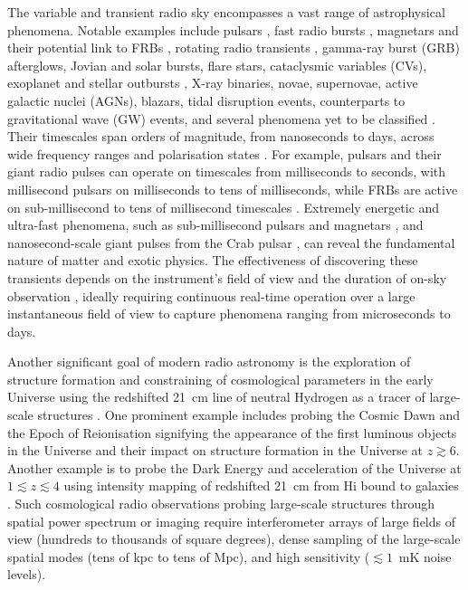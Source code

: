 \documentclass[
  journal=pasa,
  manuscript=article-type,
  year=2020,
  volume=37,
]{cup-journal}
\begin{document}
The variable and transient radio sky encompasses a vast range of astrophysical phenomena. Notable examples include pulsars \citep{Keane2013}, fast radio bursts \citep[FRB;][]{Lorimer+2007,Thornton+2013}, magnetars and their potential link to FRBs \citep{Bochenek+2020}, rotating radio transients \citep[RRAT][]{Mclaughlin+2006}, gamma-ray burst (GRB) afterglows, Jovian and solar bursts, flare stars, cataclysmic variables (CVs), exoplanet and stellar outbursts \citep{Zhang+2023}, X-ray binaries, novae, supernovae, active galactic nuclei (AGNs), blazars, tidal disruption events, counterparts to gravitational wave (GW) events, and several phenomena yet to be classified \citep{Thyagarajan+2011}. Their timescales span orders of magnitude, from nanoseconds to days, across wide frequency ranges and polarisation states \citep[][and references therein]{Pietka+2015,Chandra+2016,Nimmo+2022}. For example, pulsars and their giant radio pulses can operate on timescales from milliseconds to seconds, with millisecond pulsars on milliseconds to tens of milliseconds, while FRBs are active on sub-millisecond to tens of millisecond timescales \citep{Crawford+2022,Gupta+2022,Snelders+2023}. Extremely energetic and ultra-fast phenomena, such as sub-millisecond pulsars and magnetars \citep{Du+2009,Haskell+2018}, and nanosecond-scale giant pulses from the Crab pulsar \citep{Hankins+2003,Hankins+2007,Eilek+2016,Philippov+2019}, can reveal the fundamental nature of matter and exotic physics. The effectiveness of discovering these transients depends on the instrument's field of view and the duration of on-sky observation \citep{Cordes2007}, ideally requiring continuous real-time operation over a large instantaneous field of view to capture phenomena ranging from microseconds to days.

Another significant goal of modern radio astronomy is the exploration of structure formation and constraining of cosmological parameters in the early Universe using the redshifted 21~cm line of neutral Hydrogen as a tracer of large-scale structures \citep[][and references therein]{Morales+2010,Pritchard+2012}. One prominent example includes probing the Cosmic Dawn and the Epoch of Reionisation signifying the appearance of the first luminous objects in the Universe and their impact on structure formation in the Universe at $z\gtrsim 6$. Another example is to probe the Dark Energy and acceleration of the Universe at $1\lesssim z\lesssim 4$ using intensity mapping of redshifted 21~cm from H{\sc i} bound to galaxies \citep{CosmicVisions+2018}. Such cosmological radio observations probing large-scale structures through spatial power spectrum or imaging require interferometer arrays of large fields of view (hundreds to thousands of square degrees), dense sampling of the large-scale spatial modes (tens of kpc to tens of Mpc), and high sensitivity ($\lesssim 1$~mK noise levels). 
\end{document}
